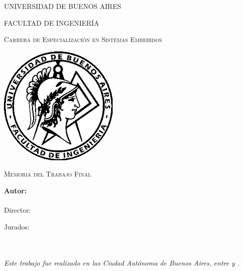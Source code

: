 \documentclass[
11pt, %
spanish,
singlespacing, %
parskip, %
headsepline, %
]{MastersDoctoralThesis}
\author{ Francisco Suárez }
\begin{document}
\frontmatter 
\pagestyle{plain} 


\begin{titlepage}
\begin{center}

{\scshape\LARGE UNIVERSIDAD DE BUENOS AIRES\par}\vspace{0.1cm} %
{\scshape\LARGE FACULTAD DE INGENIERÍA\par}\vspace{0.1cm} %
{\scshape\LARGE Carrera de Especialización en Sistemas Embebidos\par}\vspace{1cm} %

\includegraphics[width=.3\textwidth]{./Figures/logoFIUBA.png}
\vspace{1cm}

\textsc{\Large Memoria del Trabajo Final}\\[0.5cm] %

{\huge \bfseries \ttitle\par}\vspace{0.4cm} %

\vspace{1cm}
\LARGE\textbf{Autor:\\
\authorname}\\ %

\vspace{1cm}
\large
\vspace{10px}
{Director:} \\
{\supname} %
 
\vspace{1cm}
Jurados:\\
\jurunoname\\
\jurdosname\\
\jurtresname
 
\vfill
\textit{Este trabajo fue realizado en las Ciudad Autónoma de Buenos Aires, entre \fechaINICIOname \hspace{1px} y \fechaFINALname.}
\end{center}
\end{titlepage}
\end{document}

